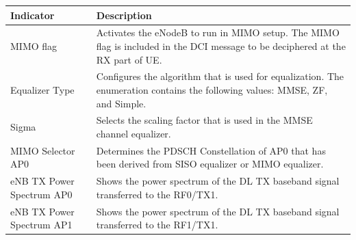\begin{landscape}
    \begin{table}[]
        \begin{tabular}{|l|p{14cm}|}
            \hline
            \textbf{Indicator}         & \textbf{Description}                                                                                                                                                                                                                                                                  \\ \hline
            MIMO flag                  & Activates the eNodeB to run in MIMO setup. The MIMO flag is included in the DCI message to be deciphered at the RX part of UE.                                                                                                                                                        \\ \hline
            Equalizer Type             & Configures the algorithm that is used for equalization. The enumeration contains the following values: MMSE, ZF, and Simple.                                                                                                                                                          \\ \hline
            Sigma                      & Selects the scaling factor that is used in the MMSE channel equalizer.                                                                                                                                                                                                                \\ \hline
            MIMO Selector AP0          & Determines the PDSCH Constellation of AP0 that has been derived from SISO equalizer or MIMO equalizer.                                                                                                                                                                                \\ \hline
            eNB TX Power Spectrum AP0  & Shows the power spectrum of the DL TX baseband signal transferred to the RF0/TX1.                                                                                                                                                                                                     \\ \hline
            eNB TX Power Spectrum AP1  & Shows the power spectrum of the DL TX baseband signal transferred to the RF1/TX1.                                                                                                                                                                                                     \\ \hline

\end{tabular}
\end{table}
\end{landscape}
